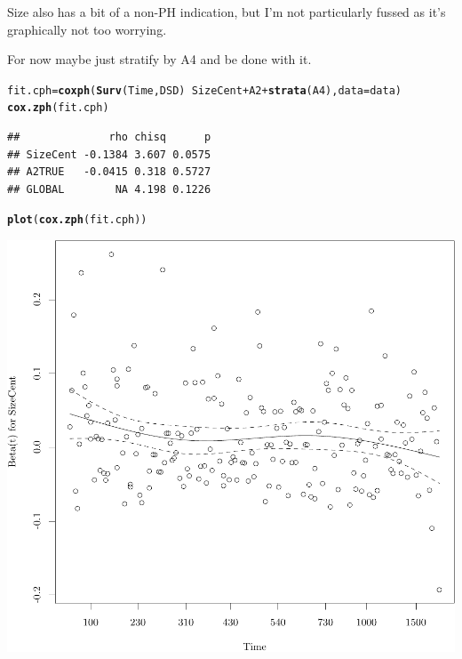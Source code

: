 \documentclass{article}\usepackage[]{graphicx}\usepackage[]{color}
\makeatletter
\def\maxwidth{ %
  \ifdim\Gin@nat@width>\linewidth
    \linewidth
  \else
    \Gin@nat@width
  \fi
}
\newcommand{\hlopt}[1]{\textcolor[rgb]{0,0,0}{#1}}%
\newcommand{\hlstd}[1]{\textcolor[rgb]{0.345,0.345,0.345}{#1}}%
\newcommand{\hlkwb}[1]{\textcolor[rgb]{0.69,0.353,0.396}{#1}}%
\newcommand{\hlkwc}[1]{\textcolor[rgb]{0.333,0.667,0.333}{#1}}%
\newcommand{\hlkwd}[1]{\textcolor[rgb]{0.737,0.353,0.396}{\textbf{#1}}}%
\newenvironment{kframe}{%
 \def\at@end@of@kframe{}%
 \ifinner\ifhmode%
  \def\at@end@of@kframe{\end{minipage}}%
  \begin{minipage}{\columnwidth}%
 \fi\fi%
 \def\FrameCommand##1{\hskip\@totalleftmargin \hskip-\fboxsep
 \colorbox{shadecolor}{##1}\hskip-\fboxsep
     \hskip-\linewidth \hskip-\@totalleftmargin \hskip\columnwidth}%
 \MakeFramed {\advance\hsize-\width
   \@totalleftmargin\z@ \linewidth\hsize
   \@setminipage}}%
 {\par\unskip\endMakeFramed%
 \at@end@of@kframe}
\newenvironment{knitrout}{}{} %
\makeatother
\begin{document}
Size also has a bit of a non-PH indication, but I'm not particularly fussed as it's graphically not too worrying.

For now maybe just stratify by A4 and be done with it.
\begin{knitrout}
\color{fgcolor}\begin{kframe}
\begin{alltt}
\hlstd{fit.cph} \hlkwb{=} \hlkwd{coxph}\hlstd{(}\hlkwd{Surv}\hlstd{(Time, DSD)} \hlopt{~} \hlstd{SizeCent} \hlopt{+} \hlstd{A2} \hlopt{+} \hlkwd{strata}\hlstd{(A4),} \hlkwc{data} \hlstd{= data)}
\hlkwd{cox.zph}\hlstd{(fit.cph)}
\end{alltt}
\begin{verbatim}
##              rho chisq      p
## SizeCent -0.1384 3.607 0.0575
## A2TRUE   -0.0415 0.318 0.5727
## GLOBAL        NA 4.198 0.1226
\end{verbatim}
\begin{alltt}
\hlkwd{plot}\hlstd{(}\hlkwd{cox.zph}\hlstd{(fit.cph))}
\end{alltt}
\end{kframe}

{\centering \includegraphics[width=\maxwidth]{figure/05-eda-final-fit-1} 

}





\end{knitrout}
\end{document}
